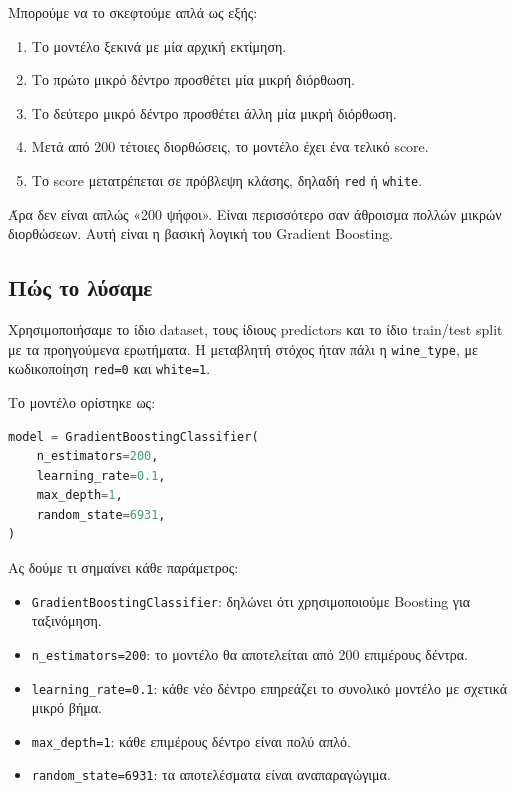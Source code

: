 \documentclass[12pt,a4paper]{article}
\newcommand{\code}[1]{\texttt{\textenglish{#1}}}
\begin{document}
Μπορούμε να το σκεφτούμε απλά ως εξής:

\begin{enumerate}
    \item Το μοντέλο ξεκινά με μία αρχική εκτίμηση.
    \item Το πρώτο μικρό δέντρο προσθέτει μία μικρή διόρθωση.
    \item Το δεύτερο μικρό δέντρο προσθέτει άλλη μία μικρή διόρθωση.
    \item Μετά από 200 τέτοιες διορθώσεις, το μοντέλο έχει ένα τελικό score.
    \item Το score μετατρέπεται σε πρόβλεψη κλάσης, δηλαδή \code{red} ή
    \code{white}.
\end{enumerate}

Άρα δεν είναι απλώς «200 ψήφοι». Είναι περισσότερο σαν άθροισμα πολλών μικρών
διορθώσεων. Αυτή είναι η βασική λογική του Gradient Boosting.

\subsection{Πώς το λύσαμε}

Χρησιμοποιήσαμε το ίδιο dataset, τους ίδιους predictors και το ίδιο train/test
split με τα προηγούμενα ερωτήματα. Η μεταβλητή στόχος ήταν πάλι η
\code{wine\_type}, με κωδικοποίηση \code{red=0} και \code{white=1}.

Το μοντέλο ορίστηκε ως:

\begin{lstlisting}[language=Python]
model = GradientBoostingClassifier(
    n_estimators=200,
    learning_rate=0.1,
    max_depth=1,
    random_state=6931,
)
\end{lstlisting}

Ας δούμε τι σημαίνει κάθε παράμετρος:

\begin{itemize}
    \item \code{GradientBoostingClassifier}: δηλώνει ότι χρησιμοποιούμε
    Boosting για ταξινόμηση.
    \item \code{n\_estimators=200}: το μοντέλο θα αποτελείται από 200
    επιμέρους δέντρα.
    \item \code{learning\_rate=0.1}: κάθε νέο δέντρο επηρεάζει το συνολικό
    μοντέλο με σχετικά μικρό βήμα.
    \item \code{max\_depth=1}: κάθε επιμέρους δέντρο είναι πολύ απλό.
    \item \code{random\_state=6931}: τα αποτελέσματα είναι αναπαραγώγιμα.
\end{itemize}
\end{document}
